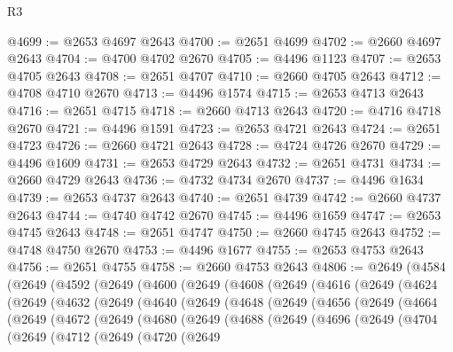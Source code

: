 \begin{lexlean}{R3}
\begin{coremodule}
@4699 := @2653 @4697 @2643
@4700 := @2651 @4699
@4702 := @2660 @4697 @2643
@4704 := @4700 @4702 @2670
@4705 := @4496 @1123
@4707 := @2653 @4705 @2643
@4708 := @2651 @4707
@4710 := @2660 @4705 @2643
@4712 := @4708 @4710 @2670
@4713 := @4496 @1574
@4715 := @2653 @4713 @2643
@4716 := @2651 @4715
@4718 := @2660 @4713 @2643
@4720 := @4716 @4718 @2670
@4721 := @4496 @1591
@4723 := @2653 @4721 @2643
@4724 := @2651 @4723
@4726 := @2660 @4721 @2643
@4728 := @4724 @4726 @2670
@4729 := @4496 @1609
@4731 := @2653 @4729 @2643
@4732 := @2651 @4731
@4734 := @2660 @4729 @2643
@4736 := @4732 @4734 @2670
@4737 := @4496 @1634
@4739 := @2653 @4737 @2643
@4740 := @2651 @4739
@4742 := @2660 @4737 @2643
@4744 := @4740 @4742 @2670
@4745 := @4496 @1659
@4747 := @2653 @4745 @2643
@4748 := @2651 @4747
@4750 := @2660 @4745 @2643
@4752 := @4748 @4750 @2670
@4753 := @4496 @1677
@4755 := @2653 @4753 @2643
@4756 := @2651 @4755
@4758 := @2660 @4753 @2643
@4806 := @2649
    (@4584
      (@2649
        (@4592
          (@2649
            (@4600
              (@2649
                (@4608
                  (@2649
                    (@4616
                      (@2649
                        (@4624
                          (@2649
                            (@4632
                              (@2649
                                (@4640
                                  (@2649
                                    (@4648
                                      (@2649
                                        (@4656
                                          (@2649
                                            (@4664
                                              (@2649
                                                (@4672
                                                  (@2649
                                                    (@4680
                                                      (@2649
                                                        (@4688
                                                          (@2649
                                                            (@4696
                                                              (@2649
                                                                (@4704
                                                                  (@2649
                                                                    (@4712
                                                                      (@2649
                                                                        (@4720
                                                                          (@2649

\end{coremodule}
\end{lexlean}
